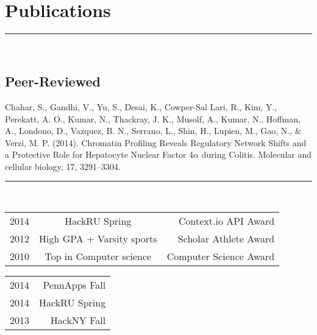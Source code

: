 \documentclass[letterpaper]{deedy-resume} %
\begin{document}
\sectionspace

\section{Publications}
\normalfont
\hrule height .1pt \leavevmode \\
\vspace{2 mm}
\subsection{Peer-Reviewed}
\textbullet{} Chahar, S., Gandhi, V., Yu, S., Desai, K., Cowper-Sal Lari, R., Kim, Y., Perekatt, A. O., Kumar, N., Thackray, J. K., Musolf, A., Kumar, N., Hoffman, A., Londono, D., Vazquez, B. N., Serrano, L., Shin, H., Lupien, M., Gao, N., \& Verzi, M. P. (2014). Chromatin Profiling Reveals Regulatory Network Shifts and a Protective Role for Hepatocyte Nuclear Factor 4$\alpha$ during Colitis. Molecular and cellular biology, 17, 3291–3304.

\sectionspace

\hfill
{}
\vspace{1 mm}
\normalfont
\hrule height .1pt \leavevmode \\
\vspace{2 mm}
\normalfont
\fontsize{10pt}{12pt}
\selectfont
\begin{minipage}[t]{0.66\textwidth}
\begin{tabular}{lcr}
2014 & HackRU Spring & Context.io API Award \\
2012 & High GPA + Varsity sports & Scholar Athlete Award \\
2010 & Top in Computer science & Computer Science Award\\

\end{tabular}
\end{minipage}
\begin{minipage}[t]{0.33\textwidth}
\hfill	
\begin{tabular}{lr}
2014 & PennApps Fall \\ 
2014 & HackRU Spring  \\
2013 & HackNY Fall \\

\end{tabular}    
\end{minipage}




\sectionspace %
\end{document}
